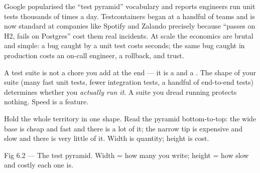  Google popularised the ``test pyramid'' vocabulary and reports engineers run unit tests thousands of times a day. Testcontainers began at a handful of teams and is now standard at companies like Spotify and Zalando precisely because ``passes on H2, fails on Postgres'' cost them real incidents. At scale the economics are brutal and simple: a bug caught by a unit test costs seconds; the same bug caught in production costs an on-call engineer, a rollback, and trust.

\begin{keyidea}
A test suite is not a chore you add at the end --- it is a  and a . The shape of your suite (many fast unit tests, fewer integration tests, a handful of end-to-end tests) determines whether you \emph{actually run it}. A suite you dread running protects nothing. Speed is a feature.
\end{keyidea}


Hold the whole territory in one shape. Read the pyramid bottom-to-top: the wide base is cheap and fast and there is a lot of it; the narrow tip is expensive and slow and there is very little of it. Width is quantity; height is cost.

\begin{wbfigure}{Fig 6.2 --- The test pyramid. Width = how many you write; height = how slow and costly each one is.}
\end{wbfigure}

